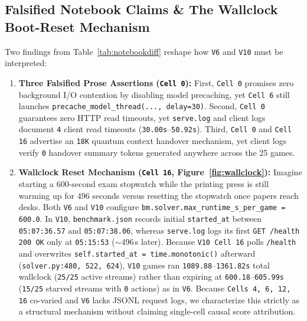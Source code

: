 \documentclass[10pt]{article}
\newcommand{\code}[1]{\texttt{#1}}
\begin{document}
\subsection{Falsified Notebook Claims \& The Wallclock Boot-Reset Mechanism}
Two findings from Table~\ref{tab:notebookdiff} reshape how \code{V6} and \code{V10} must be interpreted:
\begin{enumerate}[leftmargin=1.4em,itemsep=2pt]
\item \textbf{Three Falsified Prose Assertions (\code{Cell 0}):} First, \code{Cell 0} promises zero background I/O contention by disabling model precaching, yet \code{Cell 6} still launches \code{precache\_model\_thread(..., delay=30)}. Second, \code{Cell 0} guarantees zero HTTP read timeouts, yet \code{serve.log} and client logs document \code{4} client read timeouts (\code{30.00s}--\code{50.92s}). Third, \code{Cell 0} and \code{Cell 16} advertise an \code{18K} quantum context handover mechanism, yet client logs verify \code{0} handover summary tokens generated anywhere across the 25 games.
\item \textbf{Wallclock Reset Mechanism (\code{Cell 16}, Figure~\ref{fig:wallclock}):} Imagine starting a 600-second exam stopwatch while the printing press is still warming up for 496 seconds versus resetting the stopwatch once papers reach desks. Both \code{V6} and \code{V10} configure \code{bm.solver.max\_runtime\_s\_per\_game = 600.0}. In \code{V10}, \code{benchmark.json} records initial \code{started\_at} between \code{05:07:36.57} and \code{05:07:38.06}, whereas \code{serve.log} logs its first \code{GET /health 200 OK} only at \code{05:15:53} ($\sim$496\,s later). Because \code{V10 Cell 16} polls \code{/health} and overwrites \code{self.started\_at = time.monotonic()} afterward (\code{solver.py:480, 522, 624}), \code{V10} games ran \code{1089.88}--\code{1361.82s} total wallclock (\code{25/25} active streams) rather than expiring at \code{600.18}--\code{605.99s} (\code{15/25} starved streams with \code{0} actions) as in \code{V6}. Because \code{Cells 4, 6, 12, 16} co-varied and \code{V6} lacks JSONL request logs, we characterize this strictly as a structural mechanism without claiming single-cell causal score attribution.
\end{enumerate}
\end{document}
